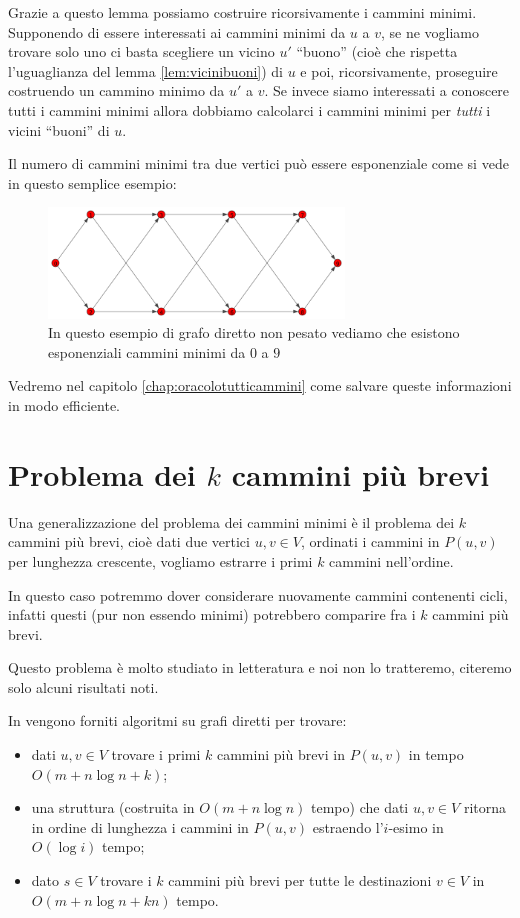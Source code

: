 \documentclass[a4paper,10pt]{amsbook}
\theoremstyle{plain}
\theoremstyle{definition}
\theoremstyle{remark}
\newcommand{\pa}[1]{\left(#1\right)}
\begin{document}
Grazie a questo lemma possiamo costruire ricorsivamente i cammini
minimi. Supponendo di essere interessati ai cammini minimi da $u$ a
$v$, se ne vogliamo trovare solo uno ci basta scegliere un vicino $u'$
``buono'' (cioè che rispetta l'uguaglianza del lemma
\ref{lem:vicinibuoni}) di $u$ e poi, ricorsivamente, proseguire
costruendo un cammino minimo da $u'$ a $v$. Se invece siamo
interessati a conoscere tutti i cammini minimi allora dobbiamo
calcolarci i cammini minimi per \emph{tutti} i vicini ``buoni'' di
$u$.

Il numero di cammini minimi tra due vertici può essere esponenziale
come si vede in questo semplice esempio:

\begin{figure}[H]
  \centering
  \includegraphics[width=0.7\textwidth]{diamante}
  \caption{In questo esempio di grafo diretto non pesato vediamo che
    esistono esponenziali cammini minimi da $0$ a $9$}
  \label{fig:diamante}
\end{figure}

Vedremo nel capitolo \ref{chap:oracolotutticammini} come salvare
queste informazioni in modo efficiente.

\section{Problema dei $k$ cammini più brevi}

Una generalizzazione del problema dei cammini minimi è il problema dei
$k$ cammini più brevi, cioè dati due vertici $u,v \in V$, ordinati i
cammini in $P(u,v)$ per lunghezza crescente, vogliamo estrarre i primi
$k$ cammini nell'ordine.

In questo caso potremmo dover considerare nuovamente cammini
contenenti cicli, infatti questi (pur non essendo minimi) potrebbero
comparire fra i $k$ cammini più brevi.

Questo problema è molto studiato in letteratura e noi non lo
tratteremo, citeremo solo alcuni risultati noti.

In \cite{kshortest} vengono forniti algoritmi su grafi diretti per
trovare:
\begin{itemize}
\item dati $u,v \in V$ trovare i primi $k$ cammini più brevi in
  $P\pa{u,v}$ in tempo $O\pa{m + n\log n + k}$;
\item una struttura (costruita in $O\pa{m+n\log n}$ tempo) che dati
  $u,v\in V$ ritorna in ordine di lunghezza i cammini in $P(u,v)$
  estraendo l'$i$-esimo in $O\pa{\log i}$ tempo;
\item dato $s\in V$ trovare i $k$ cammini più brevi per tutte le
  destinazioni $v\in V$ in $O\pa{m + n\log n + kn}$ tempo.
\end{itemize}
\end{document}

